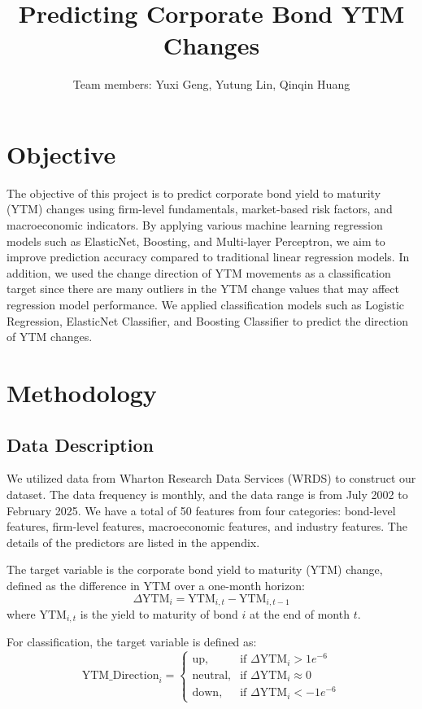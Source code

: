 \documentclass[12pt]{article}
\title{\textbf{Predicting Corporate Bond YTM Changes}}
\author{Team members: Yuxi Geng, Yutung Lin, Qinqin Huang}
\date{}
\begin{document}
\maketitle

\section{Objective}

The objective of this project is to predict corporate bond yield to maturity (YTM) changes using firm-level fundamentals, market-based risk factors, and macroeconomic indicators.
By applying various machine learning regression models such as ElasticNet, Boosting, and Multi-layer Perceptron, we aim to improve prediction accuracy compared to traditional linear regression models.
In addition, we used the change direction of YTM movements as a classification target since there are many outliers in the YTM change values that may affect regression model performance. We applied classification models such as Logistic Regression, ElasticNet Classifier, and Boosting Classifier to predict the direction of YTM changes.

\section{Methodology}

\subsection{Data Description}
We utilized data from Wharton Research Data Services (WRDS) to construct our dataset. The data frequency is monthly, and the data range is from July 2002 to February 2025.
We have a total of 50 features from four categories: bond-level features, firm-level features, macroeconomic features, and industry features. The details of the predictors are listed in the appendix.

The target variable is the corporate bond yield to maturity (YTM) change, defined as the difference in YTM over a one-month horizon:
\begin{equation}
\Delta \text{YTM}_i = \text{YTM}_{i,t} - \text{YTM}_{i,t-1}
\end{equation}
where $\text{YTM}_{i,t}$ is the yield to maturity of bond $i$ at the end of month $t$.

For classification, the target variable is defined as:
\begin{equation}
\text{YTM\_Direction}_i = 
\begin{cases}
\text{up}, & \text{if } \Delta \text{YTM}_i > 1e^{-6} \\
\text{neutral}, & \text{if } \Delta \text{YTM}_i \approx 0 \\
\text{down}, & \text{if } \Delta \text{YTM}_i < -1e^{-6}
\end{cases}
\end{equation}
\end{document}
